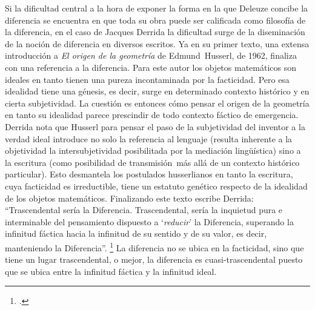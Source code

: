 Si la dificultad central a la hora de exponer la forma en la que Deleuze concibe la diferencia se encuentra en que toda su obra puede ser calificada como filosofía de la diferencia, en el caso de Jacques Derrida la dificultad surge de la diseminación de la noción de diferencia en diversos escritos. Ya en su primer texto, una extensa introducción a \emph{El origen de la geometría} de Edmund~Husserl, de 1962, finaliza con una referencia a la diferencia. Para este autor los objetos matemáticos son ideales en tanto tienen una pureza incontaminada por la facticidad. Pero esa idealidad tiene una génesis, es decir, surge en determinado contexto histórico y en cierta subjetividad. La cuestión es entonces cómo pensar el origen de la geometría en tanto su idealidad parece prescindir de todo contexto fáctico de emergencia. Derrida nota que Husserl para pensar el paso de la subjetividad del inventor a la verdad ideal introduce no solo la referencia al lenguaje (resulta inherente a la objetividad la intersubjetividad posibilitada por la mediación lingüística) sino a la escritura (como posibilidad de transmisión~más allá de un contexto histórico particular). Esto desmantela los postulados husserlianos en tanto la escritura, cuya facticidad es irreductible, tiene un estatuto genético respecto de la idealidad de los objetos matemáticos. Finalizando este texto escribe Derrida: \enquote{Trascendental sería la Diferencia. Trascendental, sería la inquietud pura e interminable del pensamiento dispuesto a \enquote{\emph{reducir}} la Diferencia, superando la infinitud fáctica hacia la infinitud de su sentido y de su valor, es decir, manteniendo la Diferencia}. \footcite[162]{@6981-DERRIDA2000} La diferencia no se ubica en la facticidad, sino que tiene un lugar trascendental, o mejor, la diferencia es cuasi-trascendental puesto que se ubica entre la infinitud fáctica y la infinitud ideal.

